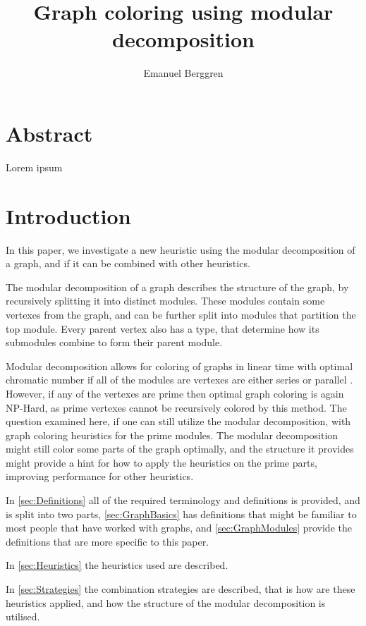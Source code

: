 \documentclass{amsart}
\author{Emanuel Berggren}
\title{Graph coloring using modular decomposition}
\begin{document}
\maketitle

\section{Abstract}

Lorem ipsum

\section{Introduction}

In this paper, we investigate a new heuristic using the modular decomposition of
a graph, and if it can be combined with other heuristics. 

The modular decomposition of a graph describes the structure of the graph, by
recursively splitting it into distinct modules. These modules contain some
vertexes from the graph, and can be further split into modules that partition
the top module. Every parent vertex also has a type, that determine how its submodules
combine to form their parent module.

Modular decomposition allows for coloring of graphs in linear time with optimal
chromatic number if all of the modules are vertexes are either  series or
parallel \cite{HCL}. However, if any of the vertexes are prime then optimal graph coloring 
is again NP-Hard, as prime vertexes cannot be recursively colored by this
method. The question examined here, if one can still utilize the
modular decomposition, with graph coloring heuristics for the prime modules.
The modular decomposition might still color some parts of the graph optimally,
and the structure it provides might provide a hint for how to apply the
heuristics on the prime parts, improving performance for other heuristics.

In \autoref{sec:Definitions} all of the required terminology and definitions is
provided, and is split into two parts, \autoref{sec:GraphBasics} has definitions that might be
familiar to most people that have worked with graphs, and
\autoref{sec:GraphModules} provide the definitions that are more specific to
this paper.

In \autoref{sec:Heuristics} the heuristics used are described.

In \autoref{sec:Strategies} the combination strategies are described, that is how are
these heuristics applied, and how the structure of the modular decomposition is
utilised.
\end{document}

